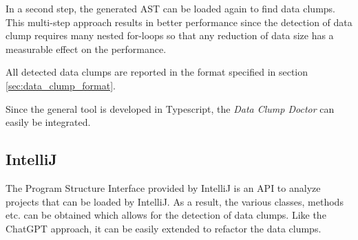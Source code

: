 In a second step, the generated \ac{AST} can be loaded again to find data clumps. This multi-step approach results in better performance since the detection of data clump requires many nested for-loops so that any reduction of data size has a measurable effect on the performance.

All detected data clumps are reported in the format specified in section \ref{sec:data_clump_format}.

Since the general tool is developed in Typescript, the \textit{Data Clump Doctor} can easily be integrated.

\begin{comment}
\subsection{ChatGPT}
ChatGPT is another approach to detect data clumps as it can process code easily and report data clumps in any format the user wants. It also supports many programming languages that other tools do not provide.

However, ChatGPT has a limited context size, so that processing large projects is  either too costly or simply not possible.

Additionally, giving ChatGPT the right instructions to find data clumps can be challenging. While ChatGPT can define and find some data clumps without further context, it is better to give it a precise definition to work with. The following definition leads to good result, however it cannot be guaranteed that this will work forever:


A data clump exists
\begin{enumerate}
   
   \item if at least three fields also exists in another class
   \item if at least three fields also exists as method parameters in some method
    \item if two methods have at least three common parameters
\end{enumerate}
\end{comment}

\subsection{IntelliJ}
The Program Structure Interface provided by IntelliJ is an \ac{API} to analyze projects that can be loaded by IntelliJ. As a result, the various classes, methods etc. can be obtained which allows for the detection of data clumps. Like the ChatGPT approach, it can be easily extended to refactor the data clumps.

